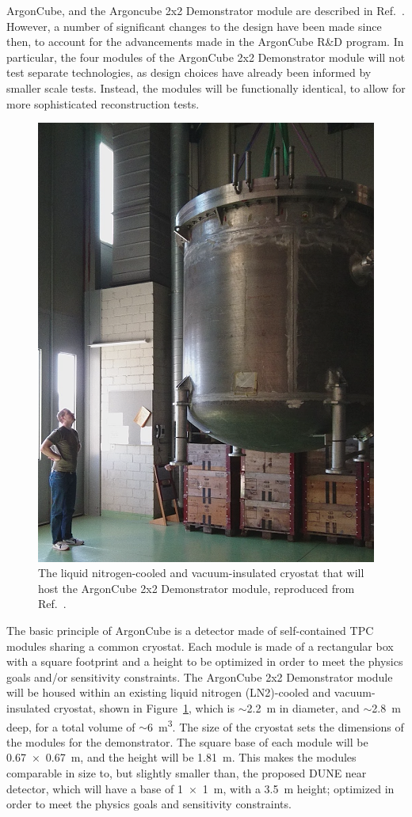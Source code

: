 ArgonCube, and the Argoncube 2x2 Demonstrator module are described in Ref.~\cite{argoncube_loi}. However, a number of significant changes to the design have been made since then, to account for the advancements made in the ArgonCube R\&D program. In particular, the four modules of the ArgonCube 2x2 Demonstrator module will not test separate technologies, as design choices have already been informed by smaller scale tests. Instead, the modules will be functionally identical, to allow for more sophisticated reconstruction tests.

\begin{figure}[htbp]
\centering
\includegraphics[width=0.45\linewidth]{plots/cryostat}
\caption{The liquid nitrogen-cooled and vacuum-insulated cryostat that will host the ArgonCube 2x2 Demonstrator module, reproduced from Ref.~\cite{argoncube_loi}.}
\label{fig:2x2_cryostat}
\end{figure}

The basic principle of ArgonCube is a detector made of self-contained TPC modules sharing a common cryostat. Each module is made of a rectangular box with a square footprint and a height to be optimized in order to meet the physics goals and/or sensitivity constraints. The ArgonCube 2x2 Demonstrator module will be housed within an existing liquid nitrogen (LN2)-cooled and vacuum-insulated cryostat, shown in Figure~\ref{fig:2x2_cryostat}, which is $\sim$\SI{2.2}{\metre} in diameter, and $\sim$\SI{2.8}{\metre} deep, for a total volume of $\sim$\SI{6}{\metre\cubed}. The size of the cryostat sets the dimensions of the modules for the demonstrator. The square base of each module will be \SI{0.67 x 0.67}{\metre}, and the height will be \SI{1.81}{\metre}. This makes the modules comparable in size to, but slightly smaller than, the proposed DUNE near detector, which will have a base of \SI{1 x 1}{\metre}, with a \SI{3.5}{\metre} height; optimized in order to meet the physics goals and sensitivity constraints.

